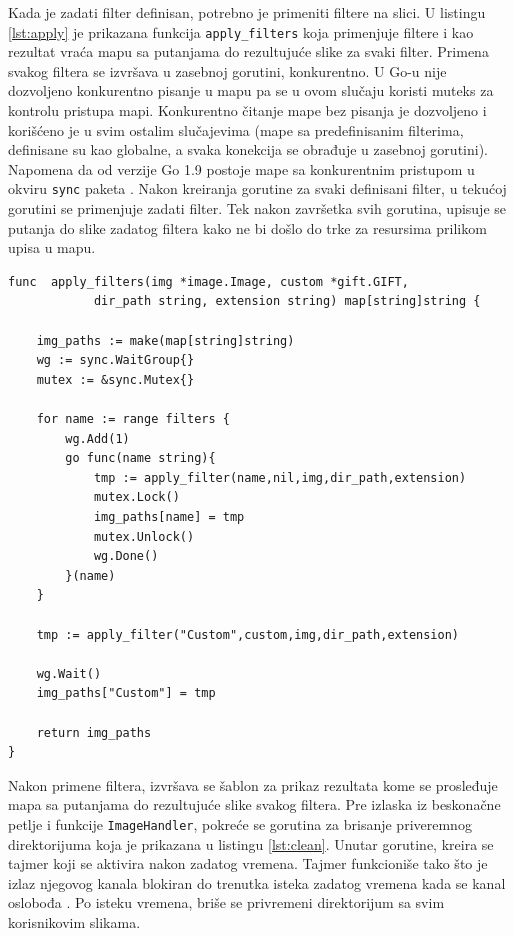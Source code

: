 \documentclass[12pt,oneside]{memoir}
\begin{document}
Kada je zadati filter definisan, potrebno je primeniti filtere na slici. U listingu \ref{lst:apply} je prikazana funkcija  \texttt{apply\_filters} koja primenjuje filtere i kao rezultat vraća mapu sa putanjama do rezultujuće slike za svaki filter. Primena svakog filtera se izvršava u zasebnoj gorutini, konkurentno. U Go-u nije dozvoljeno konkurentno pisanje u mapu pa se u ovom slučaju koristi muteks za kontrolu pristupa mapi. Konkurentno čitanje mape bez pisanja je dozvoljeno i korišćeno je u svim ostalim slučajevima (mape sa predefinisanim filterima, definisane su kao globalne, a svaka konekcija se obrađuje u zasebnoj gorutini). Napomena da od verzije Go 1.9 postoje mape sa konkurentnim pristupom u okviru \texttt{sync} paketa \cite{sync}. Nakon kreiranja gorutine za svaki definisani filter, u tekućoj gorutini se primenjuje zadati filter. Tek nakon završetka svih gorutina, upisuje se putanja do slike zadatog filtera kako ne bi došlo do trke za resursima prilikom upisa u mapu. 

\begin{center}
\begin{lstlisting}[caption=Funkcija za paralelnu primenu filtera,label={lst:apply},  backgroundcolor=\color{background}]
func  apply_filters(img *image.Image, custom *gift.GIFT, 
			dir_path string, extension string) map[string]string {

	img_paths := make(map[string]string)
	wg := sync.WaitGroup{}
	mutex := &sync.Mutex{}

	for name := range filters {
		wg.Add(1)
		go func(name string){
			tmp := apply_filter(name,nil,img,dir_path,extension)
			mutex.Lock()
			img_paths[name] = tmp
			mutex.Unlock()
			wg.Done()
		}(name)
	}

	tmp := apply_filter("Custom",custom,img,dir_path,extension)

	wg.Wait()
	img_paths["Custom"] = tmp

	return img_paths
}
\end{lstlisting}
\end{center}

Nakon primene filtera, izvršava se šablon za prikaz rezultata kome se prosleđuje mapa sa putanjama do rezultujuće slike svakog filtera. Pre izlaska iz beskonačne petlje i funkcije  \texttt{ImageHandler}, pokreće se gorutina za brisanje priveremnog direktorijuma koja je prikazana u listingu \ref{lst:clean}. Unutar gorutine, kreira se tajmer koji se aktivira nakon zadatog vremena. Tajmer funkcioniše tako što je izlaz njegovog kanala blokiran do trenutka isteka zadatog vremena kada se kanal oslobođa \cite{time}. Po isteku vremena, briše se privremeni direktorijum sa svim korisnikovim slikama. 
\end{document}
